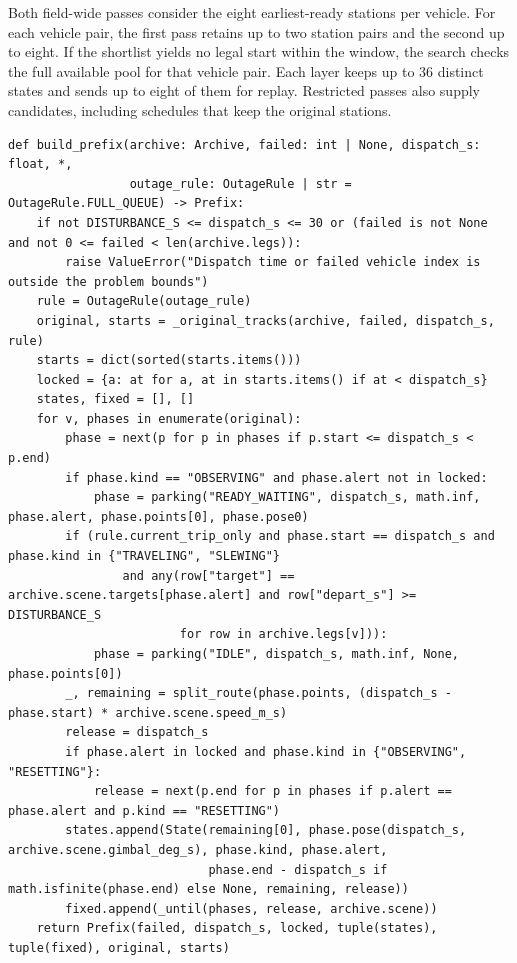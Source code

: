 \documentclass{swmcmthesis}
\begin{document}
Both field-wide passes consider the eight earliest-ready stations per vehicle. For each vehicle pair, the first pass retains up to two station pairs and the second up to eight. If the shortlist yields no legal start within the window, the search checks the full available pool for that vehicle pair. Each layer keeps up to 36 distinct states and sends up to eight of them for replay. Restricted passes also supply candidates, including schedules that keep the original stations.

\noindent{}
\begin{lstlisting}
def build_prefix(archive: Archive, failed: int | None, dispatch_s: float, *,
                 outage_rule: OutageRule | str = OutageRule.FULL_QUEUE) -> Prefix:
    if not DISTURBANCE_S <= dispatch_s <= 30 or (failed is not None and not 0 <= failed < len(archive.legs)):
        raise ValueError("Dispatch time or failed vehicle index is outside the problem bounds")
    rule = OutageRule(outage_rule)
    original, starts = _original_tracks(archive, failed, dispatch_s, rule)
    starts = dict(sorted(starts.items()))
    locked = {a: at for a, at in starts.items() if at < dispatch_s}
    states, fixed = [], []
    for v, phases in enumerate(original):
        phase = next(p for p in phases if p.start <= dispatch_s < p.end)
        if phase.kind == "OBSERVING" and phase.alert not in locked:
            phase = parking("READY_WAITING", dispatch_s, math.inf, phase.alert, phase.points[0], phase.pose0)
        if (rule.current_trip_only and phase.start == dispatch_s and phase.kind in {"TRAVELING", "SLEWING"}
                and any(row["target"] == archive.scene.targets[phase.alert] and row["depart_s"] >= DISTURBANCE_S
                        for row in archive.legs[v])):
            phase = parking("IDLE", dispatch_s, math.inf, None, phase.points[0])
        _, remaining = split_route(phase.points, (dispatch_s - phase.start) * archive.scene.speed_m_s)
        release = dispatch_s
        if phase.alert in locked and phase.kind in {"OBSERVING", "RESETTING"}:
            release = next(p.end for p in phases if p.alert == phase.alert and p.kind == "RESETTING")
        states.append(State(remaining[0], phase.pose(dispatch_s, archive.scene.gimbal_deg_s), phase.kind, phase.alert,
                            phase.end - dispatch_s if math.isfinite(phase.end) else None, remaining, release))
        fixed.append(_until(phases, release, archive.scene))
    return Prefix(failed, dispatch_s, locked, tuple(states), tuple(fixed), original, starts)
\end{lstlisting}
\end{document}
